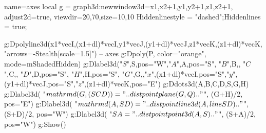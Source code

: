 \documentclass{standalone}
\begin{document}
\begin{luadraw}{name=axes}
local g = graph3d:new{window3d={x1,x2+1,y1,y2+1,z1,z2+1}, adjust2d=true, viewdir={20,70},size={10,10}}
Hiddenlinestyle = "dashed";Hiddenlines = true;

g:Dpolyline3d({{x1*vecI,(x1+dl)*vecI},{y1*vecJ,(y1+dl)*vecJ},{z1*vecK,(z1+dl)*vecK}}, "arrows={-Stealth[scale=1.5]}") -- axes
g:Dpoly(P, {color="orange", mode=mShadedHidden})
 g:Dlabel3d("$S$",S,{pos="W"},"$A$",A,{pos="S"}, "$B$",B,{}, "$C$",C,{}, "$D$",D,{pos="S"}, "$H$",H,{pos="S"}, "$G$",G,{},"$x$",(x1+dl)*vecI,{pos="S"},"$y$",(y1+dl)*vecJ,{pos="S"},"$z$",(z1+dl)*vecK,{pos="E"})
g:Ddots3d({A,B,C,D,S,G,H})
g:Dlabel3d( "$\\mathrm d(G,(SCD))="..distpointplane(G,Q).."$", (G+H)/2, {pos="E"})
g:Dlabel3d( "$\\mathrm d(A,SD)="..distpointline3d(A,lineSD).."$", (S+D)/2, {pos="W"})
g:Dlabel3d( "$SA="..distpointpoint3d(A,S).."$", (S+A)/2, {pos="W"})
g:Show()
\end{luadraw}
\end{document}
